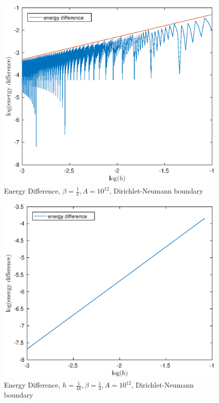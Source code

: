 \documentclass[12pt]{article}
\begin{document}
\begin{figure}[h!]
\centering
\includegraphics[scale=0.7]{energy-pi}
\caption{Energy Difference, $\beta=\frac{1}{\pi},A=10^{12}$, Dirichlet-Neumann boundary}
\end{figure}
\pagebreak
\begin{figure}[h!]
\centering
\includegraphics[scale=0.7]{energy-4}
\caption{Energy Difference, $h=\frac{1}{4k},\beta=\frac{1}{4},A=10^{12}$, Dirichlet-Neumann boundary}
\end{figure}
\end{document}
